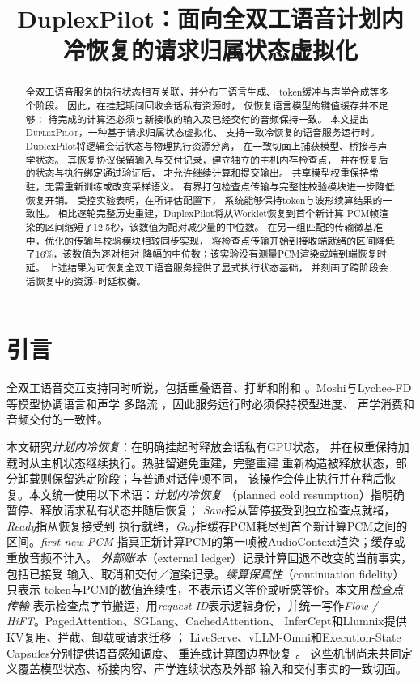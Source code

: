 \documentclass{article}
\title{DuplexPilot：面向全双工语音计划内冷恢复的请求归属状态虚拟化}
\begin{document}
\maketitle
\begin{abstract}
全双工语音服务的执行状态相互关联，并分布于语言生成、
token缓冲与声学合成等多个阶段。
因此，在挂起期间回收会话私有资源时，
仅恢复语言模型的键值缓存并不足够：
待完成的计算还必须与新接收的输入及已经交付的音频保持一致。
本文提出\textsc{DuplexPilot}，一种基于请求归属状态虚拟化、
支持一致冷恢复的语音服务运行时。
DuplexPilot将逻辑会话状态与物理执行资源分离，
在一致切面上捕获模型、桥接与声学状态。
其恢复协议保留输入与交付记录，建立独立的主机内存检查点，
并在恢复后的状态与执行绑定通过验证后，
才允许继续计算和提交输出。
共享模型权重保持常驻，无需重新训练或改变采样语义。
有界打包检查点传输与完整性校验模块进一步降低恢复开销。
受控实验表明，在所评估配置下，
系统能够保持token与波形续算结果的一致性。
相比逐轮完整历史重建，DuplexPilot将从Worklet恢复到首个新计算
PCM帧渲染的区间缩短了12.5秒，该数值为配对减少量的中位数。
在另一组匹配的传输微基准中，优化的传输与校验模块相较同步实现，
将检查点传输开始到接收端就绪的区间降低了16\%，该数值为逐对相对
降幅的中位数；该实验没有测量PCM渲染或端到端恢复时延。
上述结果为可恢复全双工语音服务提供了显式执行状态基础，
并刻画了跨阶段会话恢复中的资源--时延权衡。
\end{abstract}

\section{引言}
\label{sec:introduction}

全双工语音交互支持同时听说，包括重叠语音、打断和附和
\citep{dgslm2023,syncllm2024}。Moshi与Lychee-FD等模型协调语言和声学
多路流 \citep{moshi2024,lychee2026}，因此服务运行时必须保持模型进度、
声学消费和音频交付的一致性。

本文研究\emph{计划内冷恢复}：在明确挂起时释放会话私有GPU状态，
并在权重保持加载时从主机状态继续执行。热驻留避免重建，完整重建
重新构造被释放状态，部分卸载则保留选定阶段；与普通对话停顿不同，
该操作会停止执行并在稍后恢复。本文统一使用以下术语：\emph{计划内冷恢复}
（planned cold resumption）指明确暂停、释放请求私有状态并随后恢复；
\emph{Save}指从暂停接受到独立检查点就绪，\emph{Ready}指从恢复接受到
执行就绪，\emph{Gap}指缓存PCM耗尽到首个新计算PCM之间的区间。\emph{first-new-PCM}
指真正新计算PCM的第一帧被AudioContext渲染；缓存或重放音频不计入。
\emph{外部账本}（external ledger）记录计算回退不改变的当前事实，包括已接受
输入、取消和交付／渲染记录。\emph{续算保真性}（continuation fidelity）只表示
token与PCM的数值连续性，不表示语义等价或听感等价。本文用\emph{检查点传输}
表示检查点字节搬运，用\emph{request ID}表示逻辑身份，并统一写作\emph{Flow / HiFT}。PagedAttention、SGLang、CachedAttention、
InferCept和Llumnix提供KV复用、拦截、卸载或请求迁移
\citep{vllm2023,sglang2024,cachedattention2024,infercept2024,llumnix2024}；
LiveServe、vLLM-Omni和Execution-State Capsules分别提供语音感知调度、
重连或计算图边界恢复 \citep{liveserve2026,omnidoc,capsules2026}。
这些机制尚未共同定义覆盖模型状态、桥接内容、声学连续状态及外部
输入和交付事实的一致切面。
\end{document}
